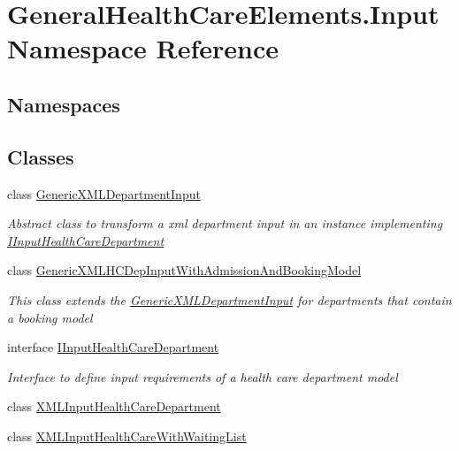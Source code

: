 \hypertarget{namespace_general_health_care_elements_1_1_input}{}\section{General\+Health\+Care\+Elements.\+Input Namespace Reference}
\label{namespace_general_health_care_elements_1_1_input}
\subsection*{Namespaces}
\begin{DoxyCompactItemize}
\end{DoxyCompactItemize}
\subsection*{Classes}
\begin{DoxyCompactItemize}
\item 
class \hyperlink{class_general_health_care_elements_1_1_input_1_1_generic_x_m_l_department_input}{Generic\+X\+M\+L\+Department\+Input}
\begin{DoxyCompactList}\small\item\em Abstract class to transform a xml department input in an instance implementing \hyperlink{interface_general_health_care_elements_1_1_input_1_1_i_input_health_care_department}{I\+Input\+Health\+Care\+Department} \end{DoxyCompactList}\item 
class \hyperlink{class_general_health_care_elements_1_1_input_1_1_generic_x_m_l_h_c_dep_input_with_admission_and_booking_model}{Generic\+X\+M\+L\+H\+C\+Dep\+Input\+With\+Admission\+And\+Booking\+Model}
\begin{DoxyCompactList}\small\item\em This class extends the \hyperlink{class_general_health_care_elements_1_1_input_1_1_generic_x_m_l_department_input}{Generic\+X\+M\+L\+Department\+Input} for departments that contain a booking model \end{DoxyCompactList}\item 
interface \hyperlink{interface_general_health_care_elements_1_1_input_1_1_i_input_health_care_department}{I\+Input\+Health\+Care\+Department}
\begin{DoxyCompactList}\small\item\em Interface to define input requirements of a health care department model \end{DoxyCompactList}\item 
class \hyperlink{class_general_health_care_elements_1_1_input_1_1_x_m_l_input_health_care_department}{X\+M\+L\+Input\+Health\+Care\+Department}
\item 
class \hyperlink{class_general_health_care_elements_1_1_input_1_1_x_m_l_input_health_care_with_waiting_list}{X\+M\+L\+Input\+Health\+Care\+With\+Waiting\+List}
\end{DoxyCompactItemize}
